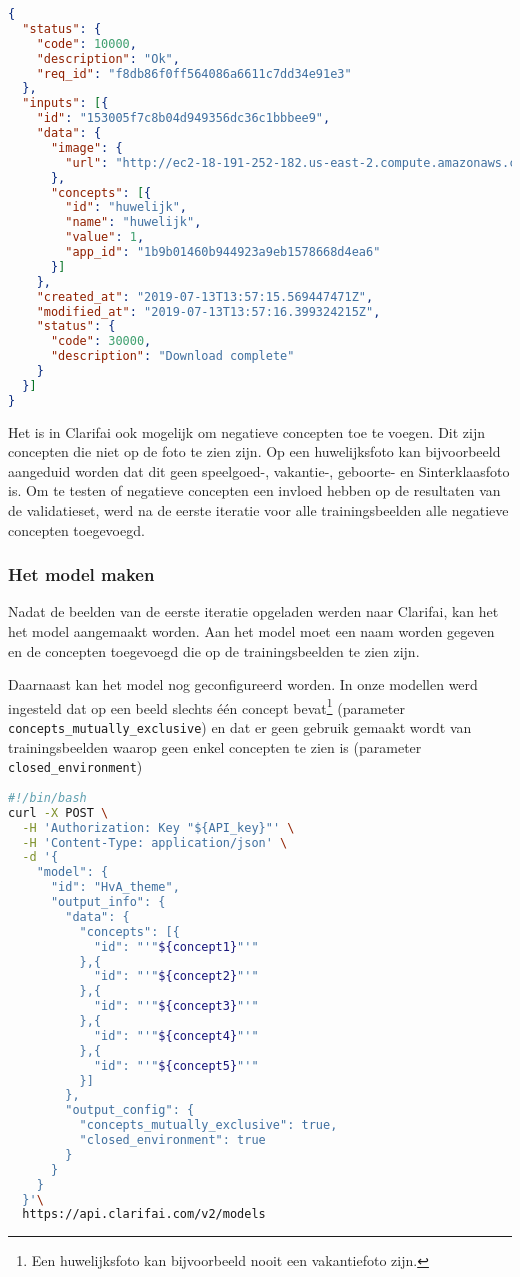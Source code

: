 \begin{lstlisting}[language=json,caption=Het antwoord van de Computer Vision API in JSON na het opladen van een beeld met een concept]
{
  "status": {
    "code": 10000,
    "description": "Ok",
    "req_id": "f8db86f0ff564086a6611c7dd34e91e3"
  },
  "inputs": [{
    "id": "153005f7c8b04d949356dc36c1bbbee9",
    "data": {
      "image": {
        "url": "http://ec2-18-191-252-182.us-east-2.compute.amazonaws.com:8182/iiif/2/2003-036-018/full/922,/0/default.jpg"
      },
      "concepts": [{
        "id": "huwelijk",
        "name": "huwelijk",
        "value": 1,
        "app_id": "1b9b01460b944923a9eb1578668d4ea6"
      }]
    },
    "created_at": "2019-07-13T13:57:15.569447471Z",
    "modified_at": "2019-07-13T13:57:16.399324215Z",
    "status": {
      "code": 30000,
      "description": "Download complete"
    }
  }]
}
\end{lstlisting}

Het is in Clarifai ook mogelijk om negatieve concepten toe te voegen. Dit zijn concepten die niet op de foto te zien zijn. Op een huwelijksfoto kan bijvoorbeeld aangeduid worden dat dit geen speelgoed-, vakantie-, geboorte- en Sinterklaasfoto is. Om te testen of negatieve concepten een invloed hebben op de resultaten van de validatieset, werd na de eerste iteratie voor alle trainingsbeelden alle negatieve concepten toegevoegd.

\subsubsection{Het model maken}
\label{subsubsec:model-maken}

Nadat de beelden van de eerste iteratie opgeladen werden naar Clarifai, kan het  het model aangemaakt worden. Aan het model moet een naam worden gegeven en de concepten toegevoegd die op de trainingsbeelden te zien zijn. 

Daarnaast kan het model nog geconfigureerd worden. In onze modellen werd ingesteld dat op een beeld slechts één concept bevat\footnote{Een huwelijksfoto kan bijvoorbeeld nooit een vakantiefoto zijn.} (parameter \texttt{concepts\_mutually\_exclusive}) en dat er geen gebruik gemaakt wordt van trainingsbeelden waarop geen enkel concepten te zien is (parameter \texttt{closed\_environment})

\begin{lstlisting}[language=bash,caption=bash commando om een custom model met vijf concepten te creëren]
#!/bin/bash
curl -X POST \
  -H 'Authorization: Key "${API_key}"' \
  -H 'Content-Type: application/json' \
  -d '{
    "model": {
      "id": "HvA_theme",
      "output_info": {
        "data": {
          "concepts": [{
            "id": "'"${concept1}"'"
          },{
            "id": "'"${concept2}"'"
          },{
            "id": "'"${concept3}"'"
          },{
            "id": "'"${concept4}"'"
          },{
            "id": "'"${concept5}"'"
          }]
        },
        "output_config": {
          "concepts_mutually_exclusive": true,
          "closed_environment": true
        }
      }
    }
  }'\
  https://api.clarifai.com/v2/models
\end{lstlisting}

